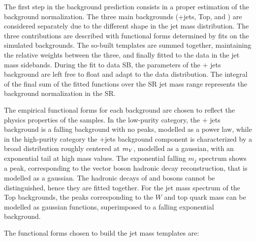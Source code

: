 The first step in the background prediction consists in a proper estimation of the background normalization. The three main backgrounds (\V+jets, Top, and \VV) are considered separately due to the different shape in the jet mass distribution. The three contributions are described with functional forms determined by fits on the simulated backgrounds. The so-built templates are summed together, maintaining the relative weights between the three, and finally fitted to the data in the jet mass sidebands. During the fit to data SB, the parameters of the \V + jets background are left free to float and adapt to the data distribution. The integral of the final sum of the fitted functions over the SR jet mass range represents the background normalization in the SR.


\noindent The empirical functional forms for each background are chosen to reflect the physics properties of the samples. In the low-purity category, the \V+ jets background is a falling background with no peaks, modelled as a power law, while in the high-purity category the \V+jets background component is characterized by a broad distribution roughly centered at $m_V$, modelled as a gaussian, with an exponential tail at high mass values. The exponential falling \VV $m_j$ spectrum shows a peak, corresponding to the vector boson hadronic decay reconstruction, that is modelled as a gaussian. The hadronic decays of \W and \Z bosons cannot be distinguished, hence they are fitted together. For the jet mass spectrum of the Top backgrounds, the peaks corresponding to the $W$ and top quark mass can be modelled as gaussian functions, superimposed to a falling exponential background.

\noindent The functional forms chosen to build the jet mass templates are:

